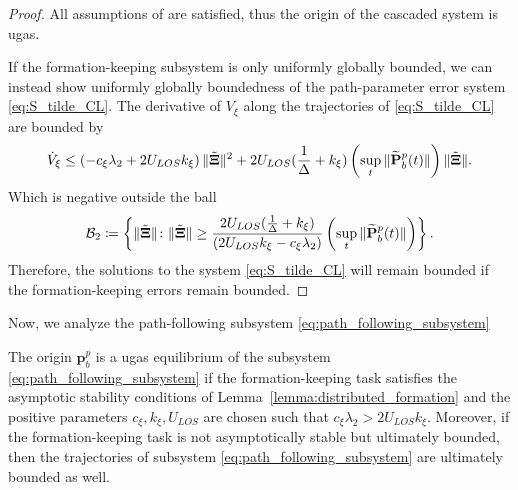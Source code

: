 \begin{proof}
All assumptions of \cite[Theorem 2.1]{lamnabhi-lagarrigue_2_2005} are satisfied, thus the origin of the cascaded system is \gls{ugas}.


If the formation-keeping subsystem is only uniformly globally bounded, we can instead show uniformly globally boundedness of the path-parameter error system \eqref{eq:S_tilde_CL}. The derivative of $V_\xi$ along the trajectories of \eqref{eq:S_tilde_CL} are bounded by
\begin{equation}
     \dot{V}_{\xi}
    \leq  \left( -c_\xi \lambda_{2} + 2 U_{LOS} k_\xi\right)\|\Tilde{\bm{\Xi}}\|^2  + 2U_{LOS}(\frac{1}{\Delta} + k_\xi) \left(\sup_t \|\widetilde{\mathbf{P}}_b^p(t)\|\right)\|\Tilde{\bm{\Xi}}\|.
\end{equation}
Which is negative outside the ball
\begin{equation}
   \mathcal{B}_2 \coloneqq \left\{ \|\Tilde{\bm{\Xi}}\| \colon \|\Tilde{\bm{\Xi}}\| \geq \frac{2U_{LOS}(\frac{1}{\Delta} + k_\xi)}{\left( 2 U_{LOS} k_\xi -c_\xi \lambda_{2}\right)}\left(\sup_t \|\widetilde{\mathbf{P}}_b^p(t)\|\right) \right\}.
\end{equation}
Therefore, the solutions to the system \eqref{eq:S_tilde_CL} will remain bounded if the formation-keeping errors remain bounded.

\end{proof}

Now, we analyze the path-following subsystem \eqref{eq:path_following_subsystem}

\begin{lemma}\label{lemma:distributed_path_following}
    The origin $\mathbf{p}_b^p$ is a \gls{ugas} equilibrium of the subsystem \eqref{eq:path_following_subsystem} if the formation-keeping task satisfies the asymptotic stability conditions of Lemma~\ref{lemma:distributed_formation} and the positive parameters $c_\xi, k_\xi, U_{LOS}$ are chosen such that $c_\xi \lambda_2 > 2 U_{LOS} k_\xi$. Moreover, if the formation-keeping task is not asymptotically stable but ultimately bounded, then the trajectories of subsystem \eqref{eq:path_following_subsystem} are ultimately bounded as well.
\end{lemma}

